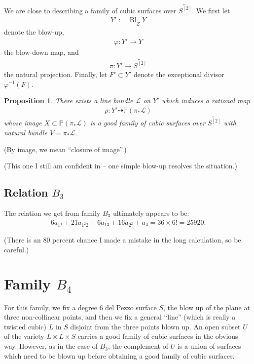 \documentclass[12 pt]{amsart}
\newtheorem{proposition}{Proposition}[section]
\renewcommand{\P}{\mathbb{P}}
\newcommand{\<}{\left\langle}
\renewcommand{\>}{\right\rangle}
\DeclareMathOperator{\Bl}{Bl}
\begin{document}
We are close to describing a family of cubic surfaces over
$\widetilde{S^{[2]}}$.  We first let
\begin{align}
  \label{eq:XB3}
  Y' := \Bl_{\widetilde{Z}}Y
\end{align}
denote the blow-up,
\begin{align}
  \label{eq:phiB3}
  \varphi: Y' \to Y
\end{align}
the blow-down map, and
\begin{align}
  \label{eq:piB3}
  \pi: Y' \to \widetilde{S^{[2]}}
\end{align}
the natural projection. Finally, let $F' \subset Y'$ denote the
exceptional divisor $\varphi^{-1}(F)$.
\begin{proposition}
  \label{proposition:resolv-b3}
  There exists a line bundle $\mathcal{L}$ on $Y'$ which induces a
  rational map
  \begin{align*}
    \rho: Y' \dashrightarrow \P(\pi_{*}\mathcal{L})
  \end{align*}
  whose image $X \subset \P(\pi_{*}\mathcal{L})$ is a good family of
  cubic surfaces over $\widetilde{S^{[2]}}$ with natural bundle
  $V = \pi_{*} \mathcal{L}$.
\end{proposition}

(By image, we mean ``closure of image''.)

(This one I still am confident in -- one simple blow-up resolves the situation.)


\subsection{Relation $B_3$}
\label{sec:relation-b_3}

The relation we get from family $B_3$ ultimately appears to be:
\begin{align}
  \label{eq:relationB3}
  6a_{1^{4}} + 21a_{1^{2}2}+6a_{13}+16a_{2^{2}}+a_{4} = 36 \times 6! = 25920.
\end{align}

(There is an 80 percent chance I made a mistake in the long
calculation, so be careful.)

\section{Family $B_4$}
\label{sec:family-b_4}

For this family, we fix a degree $6$ del Pezzo surface $S$, the blow
up of the plane at three non-collinear points, and then we fix a
general ``line'' (which is really a twisted cubic) $L$ in $S$ disjoint
from the three points blown up.  An open subset $U$ of the variety
$L \times L \times S$ carries a good family of cubic surfaces in the
obvious way. However, as in the case of $B_3$, the complement of $U$
is a union of surfaces which need to be blown up before obtaining a
good family of cubic surfaces.
\end{document}
